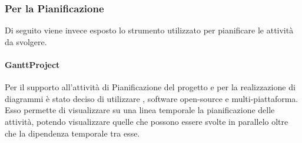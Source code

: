 \subsubsection{Per la Pianificazione}
Di seguito viene invece esposto lo strumento utilizzato per pianificare le attività da svolgere.
\paragraph{GanttProject}
Per il supporto all’attività di Pianificazione del progetto e per la realizzazione di diagrammi è stato deciso di utilizzare , software open-source e multi-piattaforma. Esso permette di visualizzare su una linea temporale la pianificazione delle attività, potendo visualizzare quelle che possono essere svolte in parallelo oltre che la dipendenza temporale tra esse.

